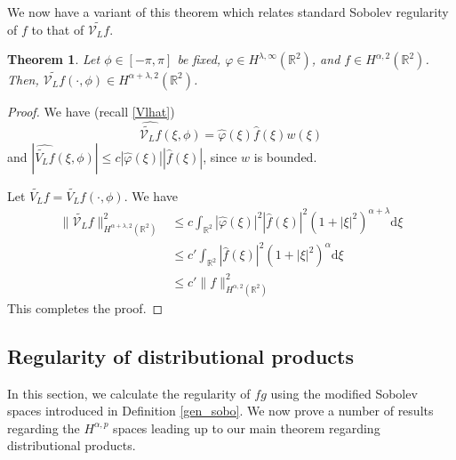 \documentclass[a4paper,12pt]{amsart}
\numberwithin{equation}{section}
\theoremstyle{plain}
\newtheorem{theorem}{Theorem}
\numberwithin{theorem}{section}
\theoremstyle{definition}
\theoremstyle{remark}
\theoremstyle{remark}
\theoremstyle{remark}
\newcommand{\seanc}[1]{\begin{quotation}\textbf{Sean's comment:\
}{\textit{#1}}\end{quotation}}
\begin{document}
We now have a variant of this theorem which relates standard Sobolev regularity of $f$ to that of $\widetilde{\mathcal{V}_L f }$.
\begin{theorem}
\label{thm_V_smth}
Let $\phi \in [-\pi,\pi]$ be fixed, $\varphi \in H^{\lambda,\infty}(\mathbb{R}^2)$, and $f \in H^{\alpha,2}(\mathbb{R}^2)$. Then, $\widetilde{\mathcal{V}_L f }(\cdot,\phi) \in H^{\alpha + \lambda,2}(\mathbb{R}^2)$.
\end{theorem}
\begin{proof}
We have (recall \eqref{Vlhat})
\begin{equation}
\widehat{\widetilde{\mathcal{V}_L}f}(\xi,\phi) = \hat{\varphi}(\xi)\hat{f}(\xi) w(\xi)
\end{equation}
and $|\widehat{\widetilde{V_L}f}(\xi,\phi)| \leq c |\hat{\varphi}(\xi)| |\hat{f}(\xi)|$, since $w$ is bounded.

Let $\widetilde{V_L}f = \widetilde{V_L}f(\cdot,\phi)$. We have
\begin{equation}
\begin{split}
\|\widetilde{\mathcal{V}_L}f\|^2_{H^{\alpha +\lambda,2}(\mathbb{R}^2)} &\leq c \int_{\mathbb{R}^2}|\hat{\varphi}(\xi)|^2|\hat{f}(\xi)|^2(1+|\xi|^2)^{\alpha+\lambda}\mathrm{d}\xi\\
& \leq c' \int_{\mathbb{R}^2}|\hat{f}(\xi)|^2(1+|\xi|^2)^{\alpha}\mathrm{d}\xi\\
& \leq c' \|f\|^2_{H^{\alpha,2}(\mathbb{R}^2)}
\end{split}
\end{equation}
This completes the proof.
\end{proof}


\subsection{Regularity of distributional products}
\label{product_section}
In this section, we calculate the regularity of $fg$ using the modified Sobolev spaces introduced in Definition \ref{gen_sobo}. We now prove a number of results regarding the $H^{\alpha,p}$ spaces leading up to our main theorem regarding distributional products.
\end{document}
